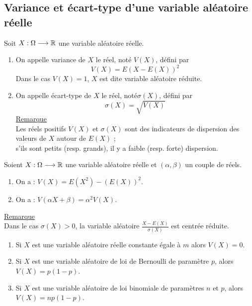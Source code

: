 \subsection{Variance et écart-type d’une variable aléatoire réelle}
\begin{defi}
    Soit \(X : \Omega \longrightarrow \mathbb{R}\) une variable aléatoire réelle.
    \begin{enumerate}
        \item On appelle variance de \(X\) le réel, noté \(V(X)\), défini par
            \[V (X) = E (X - E(X))^2\]
            Dans le cas \( V(X) = 1\), \(X\) est dite variable aléatoire réduite.
        \item On appelle écart-type de \(X\) le réel, noté\( \sigma (X)\), défini par
            \[\sigma (X) = \sqrt{V(X)}\]
    \underline{Remarque}\\
        Les réels positifs \(V(X)\) et \(\sigma (X)\) sont des indicateurs de dispersion des valeurs de \(X\) autour de \(E(X)\) ;\\
        s’ils sont petits (resp. grands), il y a faible (resp. forte) dispersion.
    \end{enumerate}
\end{defi}
\begin{prop}
    Soient \(X : \Omega \longrightarrow \mathbb{R}\) une variable aléatoire réelle et \((\alpha , \beta )\) un couple de réels.
    \begin{enumerate}
        \item On a : \(V(X) = E(X^2) - (E(X))^2\).
        \item On a : \(V(\alpha X + \beta ) = \alpha^2 V(X)\).
    \end{enumerate}
    \underline{Remarque}\\
    Dans le cas \(\sigma (X) > 0\), la variable aléatoire \(\frac{X - E(X)}{\sigma (X)}\) est centrée réduite.
\end{prop}
\begin{defprop}
    \begin{enumerate}
        \item Si \(X\) est une variable aléatoire réelle constante égale à \(m\) alors \(V(X) = 0\).
        \item Si \(X\) est une variable aléatoire de loi de Bernoulli de paramètre \(p\), alors \(V(X) = p(1 - p)\).
        \item Si \(X\) est une variable aléatoire de loi binomiale de paramètres \(n\) et \(p\), alors \(V(X) = np(1 - p)\).
    \end{enumerate}
\end{defprop}

